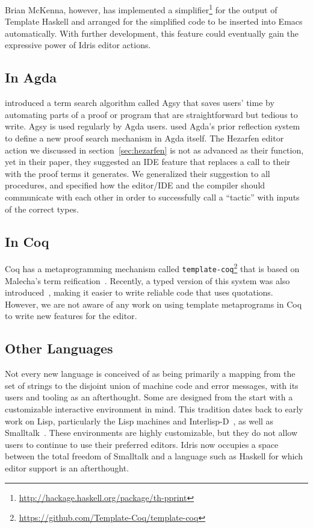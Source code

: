Brian McKenna, however, has implemented a
simplifier\footnote{\url{http://hackage.haskell.org/package/th-pprint}}
for the output of Template Haskell and arranged for the simplified
code to be inserted into Emacs automatically. With further
development, this feature could eventually gain the expressive power
of Idris editor actions.

\subsection{In Agda}

\citet{agsy} introduced a term search algorithm called
Agsy that saves users' time by automating
parts of a proof or program that are straightforward but tedious to write.
Agsy is used regularly by Agda users.
\citet{autoinagda} used Agda's prior reflection system to define a
new proof search mechanism in Agda itself.
The Hezarfen editor action we discussed in section~\ref{sec:hezarfen} is not as advanced
as their  function, yet in their paper, they suggested an IDE feature
that replaces a call to their  with the proof terms it generates.
We generalized their suggestion to all \Elab{} procedures, and specified
how the editor/IDE and the compiler should communicate with each other
in order to successfully call a ``tactic'' with inputs of the correct types.

\subsection{In Coq}

Coq has a metaprogramming mechanism called
\texttt{template-coq}\footnote{\url{https://github.com/Template-Coq/template-coq}}
that is based on Malecha's term
reification~\cite{malecha-phd}. Recently, a typed version of this
system was also introduced~\cite{typed-template-coq}, making it easier
to write reliable code that uses quotations.  However, we are not
aware of any work on using template metaprograms in Coq to write new
features for the editor.

\subsection{Other Languages}

Not every new language is conceived of as being primarily a mapping
from the set of strings to the disjoint union of machine code and
error messages, with its users and tooling as an afterthought. Some
are designed from the start with a customizable interactive
environment in mind. This tradition dates back to early work on Lisp,
particularly the Lisp machines and Interlisp-D~\citep{LispHist}, as
well as Smalltalk~\citep{Goldberg1984SmalltalkEnv}. These environments
are highly customizable, but they do not allow users to continue to
use their preferred editors. Idris now occupies a space between the
total freedom of Smalltalk and a language such as Haskell for which
editor support is an afterthought.

